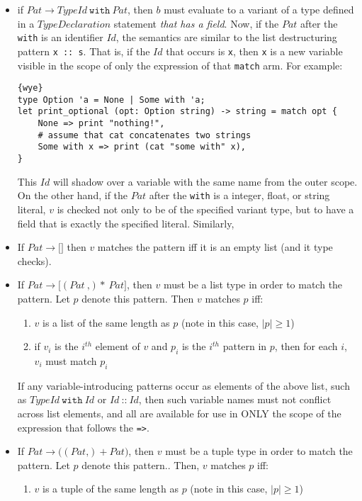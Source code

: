 \documentclass[a4paper, 12pt]{article}
\begin{document}
\begin{itemize}
\item if $Pat \to TypeId\:\texttt{with}\: Pat$, then $b$ must evaluate to a variant of a type defined in a $TypeDeclaration$ statement \textit{that has a field}. Now, if the $Pat$ after the \texttt{with} is an identifier $Id$, the semantics are similar to the list destructuring pattern \texttt{x :: s}. That is, if the $Id$ that occurs is \texttt{x}, then \texttt{x} is a new variable visible in the scope of only the expression of that \texttt{match} arm. For example:
\begin{lstlisting}{wye}
type Option 'a = None | Some with 'a;
let print_optional (opt: Option string) -> string = match opt {
	None => print "nothing!",
	# assume that cat concatenates two strings
	Some with x => print (cat "some with" x),
}
\end{lstlisting}
This $Id$ will shadow over a variable with the same name from the outer scope. On the other hand, if the $Pat$ after the \texttt{with} is a integer, float, or string literal, $v$ is checked not only to be of the specified variant type, but to have a field that is exactly the specified literal. Similarly, 
\item If $Pat \to \texttt{[}\texttt{]}$ then $v$ matches the pattern iff it is an empty list (and it type checks).
\item If $Pat \to \texttt{[}(Pat\: \texttt{,})*\: Pat\texttt{]}$, then $v$ must be a list type in order to match the pattern. Let $p$ denote this pattern. Then $v$ matches $p$ iff:
\begin{enumerate}
\item $v$ is a list of the same length as $p$ (note in this case, $|p| \geq 1$)
\item if $v_i$ is the $i^{th}$ element of $v$ and $p_i$ is the $i^{th}$ pattern in $p$, then for each $i$, $v_i$ must match $p_i$
\end{enumerate}
If any variable-introducing patterns occur as elements of the above list, such as $TypeId\:\texttt{with}\:Id$ or $Id\:\texttt{::}\:Id$, then such variable names must not conflict across list elements, and all are available for use in ONLY the scope of the expression that follows the \texttt{=>}.
\item If $Pat \to \texttt{(}(Pat\texttt{,})+ Pat\texttt{)}$, then $v$ must be a tuple type in order to match the pattern. Let $p$ denote this pattern.. Then, $v$ matches $p$ iff:
\begin{enumerate}
\item $v$ is a tuple of the same length as $p$ (note in this case, $|p| \geq 1$)

\end{enumerate}
\end{itemize}
\end{document}
